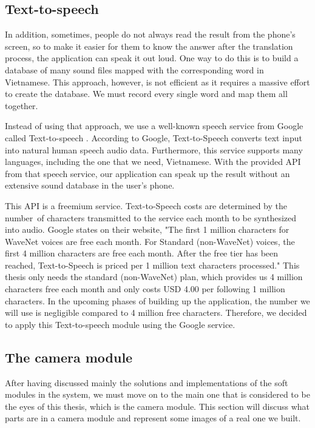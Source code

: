 \subsection{Text-to-speech}

In addition, sometimes, people do not always read the result from the phone's screen, so to make it easier for them to know the answer after the translation process, the application can speak it out loud. One way to do this is to build a database of many sound files mapped with the corresponding word in Vietnamese. This approach, however, is not efficient as it requires a massive effort to create the database. We must record every single word and map them all together.

Instead of using that approach, we use a well-known speech service from Google called Text-to-speech \cite{GG:Text-to-Speech}. According to Google, Text-to-Speech converts text input into natural human speech audio data. Furthermore, this service supports many languages, including the one that we need, Vietnamese. With the provided API from that speech service, our application can speak up the result without an extensive sound database in the user's phone.

This API is a freemium service. Text-to-Speech costs are determined by the number of characters transmitted to the service each month to be synthesized into audio. Google states on their website,  "The first 1 million characters for WaveNet voices are free each month. For Standard (non-WaveNet) voices, the first 4 million characters are free each month. After the free tier has been reached, Text-to-Speech is priced per 1 million text characters processed." This thesis only needs the standard (non-WaveNet) plan, which provides us 4 million characters free each month and only costs USD 4.00 per following 1 million characters. In the upcoming phases of building up the application, the number we will use is negligible compared to 4 million free characters. Therefore, we decided to apply this Text-to-speech module using the Google service.

\subsection{The camera module}

After having discussed mainly the solutions and implementations of the soft modules in the system, we must move on to the main one that is considered to be the eyes of this thesis, which is the camera module. This section will discuss what parts are in a camera module and represent some images of a real one we built.

